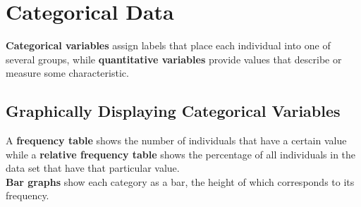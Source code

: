 \documentclass[../AP_Statistics.tex]{subfiles}
\begin{document}
	\chapter{Categorical Data}
		\textbf{Categorical variables} assign labels that place each individual into one of several groups, while \textbf{quantitative variables} provide values that describe or measure some characteristic. \\
		\section{Graphically Displaying Categorical Variables}
			A \textbf{frequency table} shows the number of individuals that have a certain value while a \textbf{relative frequency table} shows the percentage of all individuals in the data set that have that particular value. \\
			\textbf{Bar graphs} show each category as a bar, the height of which corresponds to its frequency. \\
\end{document}
